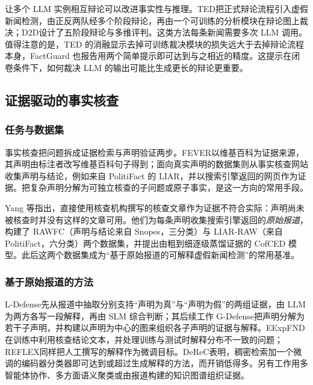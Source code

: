 让多个 LLM 实例相互辩论可以改进事实性与推理\citep{du2024debate,liang2024mad,chan2024chateval}。TED\citep{liu2025ted}把正式辩论流程引入虚假新闻检测，由正反两队经多个阶段辩论，再由一个可训练的分析模块在辩论图上裁决；D2D\citep{han2025d2d}设计了五阶段辩论与多维评判。这类方法每条新闻需要多次 LLM 调用。值得注意的是，TED 的消融显示去掉可训练裁决模块的损失远大于去掉辩论流程本身\citep{liu2025ted}，FactGuard 也报告用两个简单提示即可达到与之相近的精度\citep{he2026factguard}。这提示在闭卷条件下，如何裁决 LLM 的输出可能比生成更长的辩论更重要。

\subsection{证据驱动的事实核查}

\subsubsection{任务与数据集}
事实核查把问题拆成证据检索与声明验证两步\citep{guo2022survey}。FEVER\citep{thorne2018fever}以维基百科为证据来源，其声明由标注者改写维基百科句子得到；面向真实声明的数据集则从事实核查网站收集声明与结论，例如来自 PolitiFact 的 LIAR\citep{wang2017liar}，并以搜索引擎返回的网页作为证据\citep{popat2018declare,schlichtkrull2023averitec}。把复杂声明分解为可独立核查的子问题或原子事实，是这一方向的常用手段\citep{chen2022claimdecomp,pan2023programfc,zhang2023hiss,min2023factscore}。

Yang 等\citep{yang2022cofced}指出，直接使用核查机构撰写的核查文章作为证据不符合实际：声明尚未被核查时并没有这样的文章可用。他们为每条声明收集搜索引擎返回的\emph{原始报道}，构建了 RAWFC（声明与结论来自 Snopes，三分类）与 LIAR-RAW（来自 PolitiFact，六分类）两个数据集，并提出由粗到细逐级蒸馏证据的 CofCED 模型。此后这两个数据集成为“基于原始报道的可解释虚假新闻检测”的常用基准。

\subsubsection{基于原始报道的方法}
L-Defense\citep{wang2024ldefense}先从报道中抽取分别支持“声明为真”与“声明为假”的两组证据，由 LLM 为两方各写一段解释，再由 SLM 综合判断；其后续工作 G-Defense\citep{wang2026gdefense}把声明分解为若干子声明，并构建以声明为中心的图来组织各子声明的证据与解释。EExpFND\citep{wang2025eexpfnd}在训练中利用核查结论文本，并处理训练与测试时解释分布不一致的问题；REFLEX\citep{kong2026reflex}同样把人工撰写的解释作为微调目标。DeReC\citep{qazi2025derec}表明，稠密检索加一个微调的编码器分类器即可达到或超过生成解释的方法，而开销低得多。另有工作用多智能体协作\citep{xiong2025delphiagent}、多方面语义聚类\citep{nguyen2025facets}或由报道构建的知识图谱\citep{lourenco2026kgcraft}组织证据。


